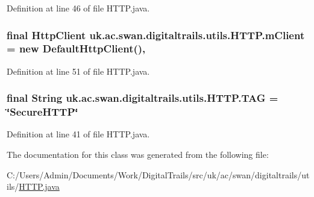 Definition at line 46 of file H\+T\+T\+P.\+java.

\hypertarget{classuk_1_1ac_1_1swan_1_1digitaltrails_1_1utils_1_1_h_t_t_p_adbbbacce43ac6e90ee0f09865d385eb3}{
\subsubsection[{m\+Client}]{\setlength{\rightskip}{0pt plus 5cm}final Http\+Client uk.\+ac.\+swan.\+digitaltrails.\+utils.\+H\+T\+T\+P.\+m\+Client = new Default\+Http\+Client()\hspace{0.3cm}{\ttfamily [static]}, {\ttfamily [private]}}}\label{classuk_1_1ac_1_1swan_1_1digitaltrails_1_1utils_1_1_h_t_t_p_adbbbacce43ac6e90ee0f09865d385eb3}


Definition at line 51 of file H\+T\+T\+P.\+java.

\hypertarget{classuk_1_1ac_1_1swan_1_1digitaltrails_1_1utils_1_1_h_t_t_p_af0ea53de9d06c95f912175c13ecb89ba}{
\subsubsection[{T\+A\+G}]{\setlength{\rightskip}{0pt plus 5cm}final String uk.\+ac.\+swan.\+digitaltrails.\+utils.\+H\+T\+T\+P.\+T\+A\+G = \char`\"{}Secure\+H\+T\+T\+P\char`\"{}\hspace{0.3cm}{\ttfamily [static]}}}\label{classuk_1_1ac_1_1swan_1_1digitaltrails_1_1utils_1_1_h_t_t_p_af0ea53de9d06c95f912175c13ecb89ba}


Definition at line 41 of file H\+T\+T\+P.\+java.



The documentation for this class was generated from the following file\+:\begin{DoxyCompactItemize}
\item 
C\+:/\+Users/\+Admin/\+Documents/\+Work/\+Digital\+Trails/src/uk/ac/swan/digitaltrails/utils/\hyperlink{_h_t_t_p_8java}{H\+T\+T\+P.\+java}\end{DoxyCompactItemize}
